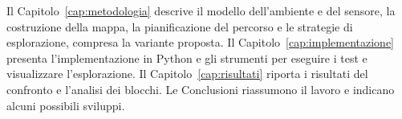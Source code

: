 Il Capitolo~\ref{cap:metodologia} descrive il modello dell'ambiente e del sensore, la costruzione della mappa, la pianificazione del percorso e le strategie di esplorazione, compresa la variante proposta. Il Capitolo~\ref{cap:implementazione} presenta l'implementazione in Python e gli strumenti per eseguire i test e visualizzare l'esplorazione. Il Capitolo~\ref{cap:risultati} riporta i risultati del confronto e l'analisi dei blocchi. Le Conclusioni riassumono il lavoro e indicano alcuni possibili sviluppi.
